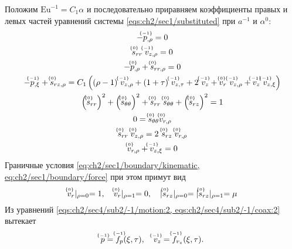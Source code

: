 Положим $\text{Eu}^{-1} = C_1 \alpha$ и последовательно приравняем коэффициенты правых и левых частей уравнений системы \cref{eqs:ch2/sec1/substituted} при $a^{-1}$ и $\alpha^0$:
\begin{subequations}
  \label{eqs:ch2/sec4/sub2/main}
  \begin{gather}
    \label{eqs:ch2/sec4/sub2/-1/motion:2}
    -\uindex{p}{-1}_{,\rho} = 0
    \\
    \label{eqs:ch2/sec4/sub2/-1/coax:2}
    \uindex{s}{0}_{rr} \; \uindex{v}{-1}_{z,\rho} = 0
    \\
    \label{eqs:ch2/sec4/sub2/0/motion:1}
    -\uindex{p}{0}_{,\rho}+\uindex{s}{0}_{rr,\rho} = 0
    \\
    \label{eqs:ch2/sec4/sub2/0/motion:2}
    -\uindex{p}{-1}_{,\xi} + \uindex{s}{0}_{rz,\rho} = C_1 \left((\rho-1) \ \uindex{v}{-1}_{z,\rho} + (1+\tau) \ \uindex{v}{-1}_{z,\tau} + 2 \ \uindex{v}{-1}_{z} + \uindex{v}{0}_{r} \ \uindex{v}{-1}_{z,\rho} + \uindex{v}{-1}_{z} \ \uindex{v}{-1}_{z,\xi} \right)
    \\
    \label{eqs:ch2/sec4/sub2/0/plasticity}
    \left(\uindex{s}{0}_{rr}\right)^2 + \left(\uindex{s}{0}_{\theta\theta}\right)^2 + \uindex{s}{0}_{rr}\; \uindex{s}{0}_{\theta\theta} + \left(\uindex{s}{0}_{rz}\right)^2 = 1
    \\
    \label{eqs:ch2/sec4/sub2/0/coax:1}
    0 = \uindex{s}{0}_{\theta\theta} \uindex{v}{0}_{r,\rho}
    \\
    \label{eqs:ch2/sec4/sub2/0/coax:2}
    \uindex{s}{0}_{rr} \; \uindex{v}{0}_{z,\rho} = 2 \ \uindex{s}{0}_{rz} \; \uindex{v}{0}_{r,\rho}
    \\
    \label{eqs:ch2/sec4/sub2/0/uncompress}
    \uindex{v}{0}_{r,\rho} + \uindex{v}{-1}_{z,\xi} = 0
  \end{gather}
\end{subequations}
Граничные условия \cref{eq:ch2/sec1/boundary/kinematic, eq:ch2/sec1/boundary/force} при этом примут вид
\begin{equation}
  \label{eq:ch2/sec4/sub2/boundary/0}
  \uindex{v}{0}_{r}\lvert_{\rho=0} = 1,\quad \uindex{v}{0}_{r}\lvert_{\rho=1} = 0, \quad \lvert \uindex{s}{0}_{rz}\lvert_{\rho=0} = \lvert \uindex{s}{0}_{rz}\lvert_{\rho=1} = \mu
\end{equation}
Из уравнений \cref{eqs:ch2/sec4/sub2/-1/motion:2, eqs:ch2/sec4/sub2/-1/coax:2} вытекает
\begin{equation*}
  \uindex{p}{-1} = \uindex{f}{-1}_{p}(\xi, \tau), \quad \uindex{v}{-1}_{z} = \uindex{f}{-1}_{v_{z}}(\xi, \tau).
\end{equation*}
